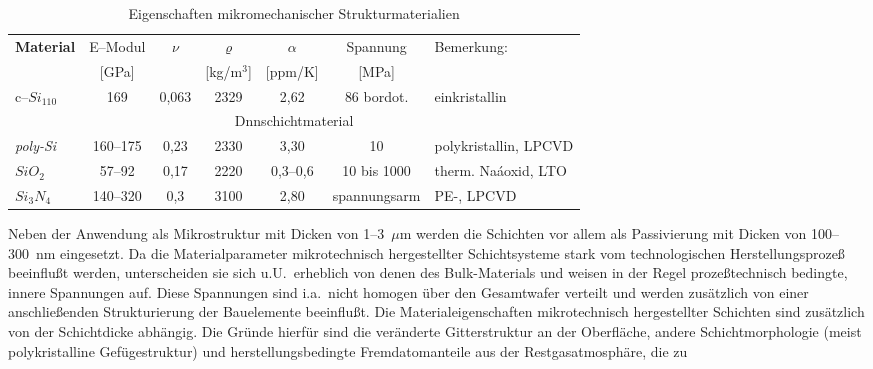 \begin{table}[htb]
\caption{\label{tabsubstrate}
 Eigenschaften mikromechanischer Strukturmaterialien}
\begin{center}
\begin{small}
\begin{tabular}{|l||c|c|c|c|c||l|}\hline
{\bf Material} & E--Modul & $\nu$ & $\varrho$ & $\alpha$ & Spannung &
                 Bemerkung: \\
                 & [GPa] &  & [kg/m$^{3}$] & [ppm/K] & [MPa]   & \\
\hline \hline
c--$Si_{110}$   &   169   & 0,063  &  2329  & 2,62 & 86 bordot. &
                                               einkristallin \\
\hline
\multicolumn{7}{|c|}{Dnnschichtmaterial} \\
\hline
{\em poly-Si}  & 160--175 & 0,23   &  2330  & 3,30 & 10  &
                                               polykristallin, LPCVD \\
\hline
$SiO_{2}$      & 57--92   &  0,17  &  2220  & 0,3--0,6 & 10 bis 1000 &
                                                therm. Naáoxid, LTO \\
\hline
$Si_{3}N_{4}$  & 140--320 &  0,3   &  3100  & 2,80  & spannungsarm &
                                                      PE-, LPCVD \\
\hline
\end{tabular}
\end{small}
\end{center}
\end{table}
Neben der Anwendung als Mikrostruktur mit Dicken von 1--3~$\mu$m werden die
Schichten vor allem als Passivierung mit Dicken von 100--300~nm eingesetzt.
Da die Materialparameter mikrotechnisch hergestellter Schichtsysteme
stark vom technologischen Herstellungsprozeß beeinflußt werden,
unterscheiden sie sich u.U.\ erheblich von denen des Bulk-Materials und
weisen in der Regel prozeßtechnisch bedingte, innere Spannungen auf.
Diese Spannungen sind i.a.\ nicht homogen über den Gesamtwafer verteilt
und werden zusätzlich von einer anschließenden Strukturierung der
Bauelemente beeinflußt. Die Materialeigenschaften mikrotechnisch
hergestellter Schichten sind zusätzlich von der Schichtdicke abhängig.
Die Gründe hierfür sind die veränderte Gitterstruktur an der Oberfläche,
andere Schichtmorphologie (meist polykristalline Gefügestruktur) und
herstellungsbedingte Fremdatomanteile aus der Restgasatmosphäre, die zu
